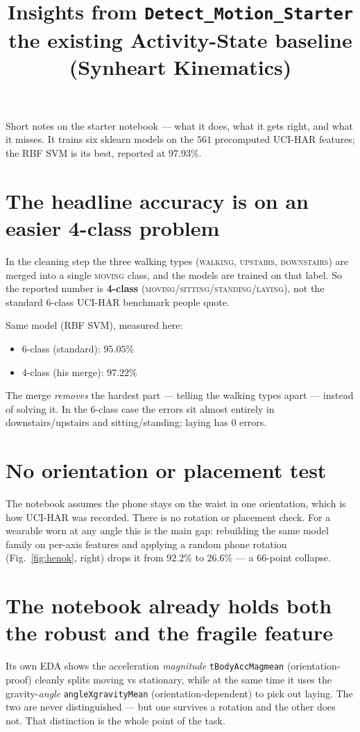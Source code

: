 \documentclass[11pt]{article}
\title{Insights from \texttt{Detect\_Motion\_Starter}\\[2pt]
\large the existing Activity-State baseline (Synheart Kinematics)}
\date{}
\begin{document}
\maketitle

Short notes on the starter notebook --- what it does, what it gets right, and
what it misses. It trains six sklearn models on the $561$ precomputed UCI-HAR
features; the RBF SVM is its best, reported at $97.93\%$.

\section{The headline accuracy is on an easier 4-class problem}
In the cleaning step the three walking types (\textsc{walking},
\textsc{upstairs}, \textsc{downstairs}) are merged into a single \textsc{moving}
class, and the models are trained on that label. So the reported number is
\textbf{4-class} (\textsc{moving}/\textsc{sitting}/\textsc{standing}/\textsc{laying}),
not the standard 6-class UCI-HAR benchmark people quote.

Same model (RBF SVM), measured here:
\begin{itemize}[noitemsep]
  \item 6-class (standard): $95.05\%$
  \item 4-class (his merge): $97.22\%$
\end{itemize}
The merge \emph{removes} the hardest part --- telling the walking types apart ---
instead of solving it. In the 6-class case the errors sit almost entirely in
downstairs/upstairs and sitting/standing; laying has $0$ errors.

\section{No orientation or placement test}
The notebook assumes the phone stays on the waist in one orientation, which is how
UCI-HAR was recorded. There is no rotation or placement check. For a wearable worn
at any angle this is the main gap: rebuilding the same model family on per-axis
features and applying a random phone rotation (Fig.~\ref{fig:henok}, right) drops
it from $92.2\%$ to $26.6\%$ --- a 66-point collapse.

\section{The notebook already holds both the robust and the fragile feature}
Its own EDA shows the acceleration \emph{magnitude} \texttt{tBodyAccMagmean}
(orientation-proof) cleanly splits moving vs stationary, while at the same time it
uses the gravity-\emph{angle} \texttt{angleXgravityMean} (orientation-dependent) to
pick out laying. The two are never distinguished --- but one survives a rotation and
the other does not. That distinction is the whole point of the task.
\end{document}
